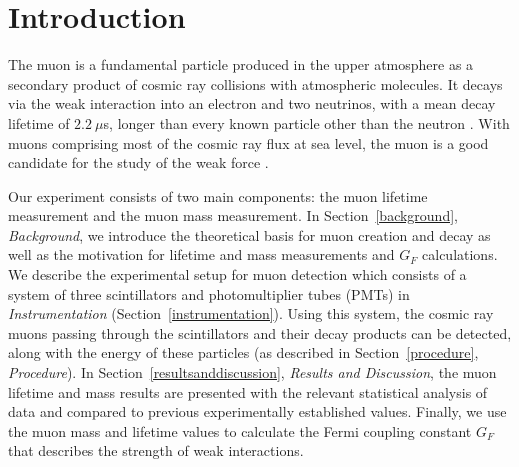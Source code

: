 
\section{Introduction}\label{introduction}

The muon is a fundamental particle produced in the upper atmosphere as
a secondary product of cosmic ray collisions with atmospheric
molecules. It decays via the weak interaction into an electron and two
neutrinos, with a mean decay lifetime of $2.2~\mu$s, longer than
every known particle other than the neutron \cite{pdg}. With muons
comprising most of the cosmic ray flux at sea level, the muon is a
good candidate for the study of the weak force \cite[p.~8]{rossi}.

Our experiment consists of two main components: the muon lifetime
measurement and the muon mass measurement. In
Section~\ref{background}, \emph{Background}, we introduce the
theoretical basis for muon creation and decay as well as the
motivation for lifetime and mass measurements and $G_{F}$ calculations. We describe the
experimental setup for muon detection which consists of a system of
three scintillators and photomultiplier tubes (PMTs) in
\emph{Instrumentation} (Section~\ref{instrumentation}). Using this
system, the cosmic ray muons passing through the scintillators and
their decay products can be detected, along with the energy of these
particles (as described in Section~\ref{procedure}, \emph{Procedure}). In Section~\ref{resultsanddiscussion}, \emph{Results and Discussion}, the muon lifetime and
mass results are presented with the relevant statistical analysis of
data and compared to previous experimentally established
values. Finally, we use the muon mass and lifetime values to calculate
the Fermi coupling constant $G_F$ that describes the strength of weak
interactions.

